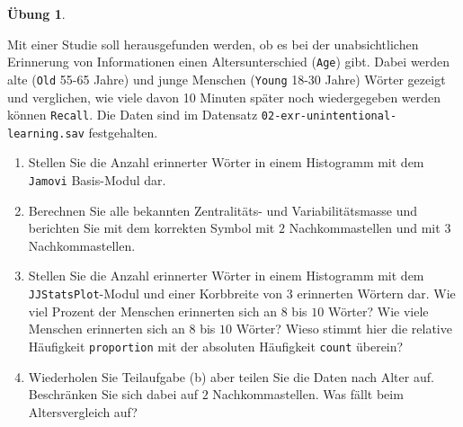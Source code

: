 \documentclass[
]{book}
\providecommand{\tightlist}{%
  \setlength{\itemsep}{0pt}\setlength{\parskip}{0pt}}
\theoremstyle{definition}
\theoremstyle{definition}
\theoremstyle{definition}
\newtheorem{exercise}{Übung}[chapter]
\theoremstyle{definition}
\theoremstyle{remark}
\begin{document}
\begin{exercise}
\protect\hypertarget{exr:unintentional-learning}{}\label{exr:unintentional-learning}\leavevmode

Mit einer Studie soll herausgefunden werden, ob es bei der unabsichtlichen Erinnerung von Informationen einen Altersunterschied (\texttt{Age}) gibt. Dabei werden alte (\texttt{Old} 55-65 Jahre) und junge Menschen (\texttt{Young} 18-30 Jahre) Wörter gezeigt und verglichen, wie viele davon 10 Minuten später noch wiedergegeben werden können \texttt{Recall}. Die Daten sind im Datensatz \texttt{02-exr-unintentional-learning.sav} festgehalten.

\begin{enumerate}
\def\labelenumi{(\alph{enumi})}
\tightlist
\item
  Stellen Sie die Anzahl erinnerter Wörter in einem Histogramm mit dem \texttt{Jamovi} Basis-Modul dar.
\item
  Berechnen Sie alle bekannten Zentralitäts- und Variabilitätsmasse und berichten Sie mit dem korrekten Symbol mit \(2\) Nachkommastellen und mit \(3\) Nachkommastellen.
\item
  Stellen Sie die Anzahl erinnerter Wörter in einem Histogramm mit dem \texttt{JJStatsPlot}-Modul und einer Korbbreite von \(3\) erinnerten Wörtern dar. Wie viel Prozent der Menschen erinnerten sich an \(8\) bis \(10\) Wörter? Wie viele Menschen erinnerten sich an \(8\) bis \(10\) Wörter? Wieso stimmt hier die relative Häufigkeit \texttt{proportion} mit der absoluten Häufigkeit \texttt{count} überein?
\item
  Wiederholen Sie Teilaufgabe (b) aber teilen Sie die Daten nach Alter auf. Beschränken Sie sich dabei auf \(2\) Nachkommastellen. Was fällt beim Altersvergleich auf?
\end{enumerate}

\end{exercise}
\end{document}
